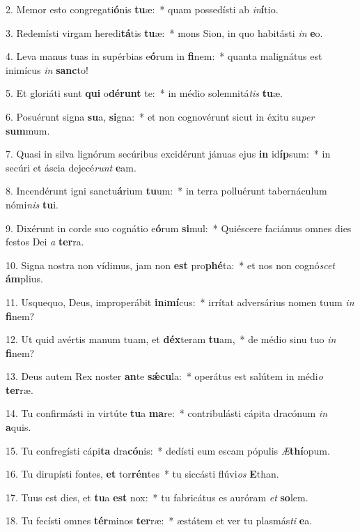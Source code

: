 2. Memor esto congregati\textbf{ó}nis \textbf{tu}æ:~*  quam possedísti ab \textit{in}\textbf{í}tio.\

3. Redemísti virgam heredi\textbf{tá}tis \textbf{tu}æ:~*  mons Sion, in quo habitásti \textit{in} \textbf{e}o.\

4. Leva manus tuas in supérbias e\textbf{ó}rum in \textbf{fi}nem:~*  quanta malignátus est inimícus \textit{in} \textbf{sanc}to!\

5. Et gloriáti sunt \textbf{qui} o\textbf{dé}\textbf{runt} te:~*  in médio solemnitá\textit{tis} \textbf{tu}æ.\

6. Posuérunt signa \textbf{su}a, \textbf{si}gna:~*  et non cognovérunt sicut in éxitu su\textit{per} \textbf{sum}mum.\

7. Quasi in silva lignórum secúribus excidérunt jánuas ejus \textbf{in} id\textbf{íp}sum:~*  in secúri et áscia dejecé\textit{runt} \textbf{e}am.\

8. Incendérunt igni sanctu\textbf{á}rium \textbf{tu}um:~*  in terra polluérunt tabernáculum nómi\textit{nis} \textbf{tu}i.\

9. Dixérunt in corde suo cognátio e\textbf{ó}rum \textbf{si}mul:~*  Quiéscere faciámus omnes dies festos Dei \textit{a} \textbf{ter}ra.\

10. Signa nostra non vídimus, jam non \textbf{est} pro\textbf{phé}ta:~*  et nos non cognó\textit{scet} \textbf{ám}plius.\

11. Usquequo, Deus, improperábit \textbf{in}i\textbf{mí}cus:~*  irrítat adversárius nomen tuum \textit{in} \textbf{fi}nem?\

12. Ut quid avértis manum tuam, et \textbf{déx}teram \textbf{tu}am,~*  de médio sinu tuo \textit{in} \textbf{fi}nem?\

13. Deus autem Rex noster \textbf{an}te \textbf{sǽ}\textbf{cu}la:~*  operátus est salútem in médi\textit{o} \textbf{ter}ræ.\

14. Tu confirmásti in virtúte \textbf{tu}a \textbf{ma}re:~*  contribulásti cápita dracónum \textit{in} \textbf{a}quis.\

15. Tu confregísti cápi\textbf{ta} dra\textbf{có}nis:~*  dedísti eum escam pópulis \textit{Æ}\textbf{thí}opum.\

16. Tu dirupísti fontes, \textbf{et} tor\textbf{rén}tes~*  tu siccásti flúvi\textit{os} \textbf{E}than.\

17. Tuus est dies, et \textbf{tu}a \textbf{est} nox:~*  tu fabricátus es auróram \textit{et} \textbf{so}lem.\

18. Tu fecísti omnes \textbf{tér}minos \textbf{ter}ræ:~*  æstátem et ver tu plasmás\textit{ti} \textbf{e}a.\

